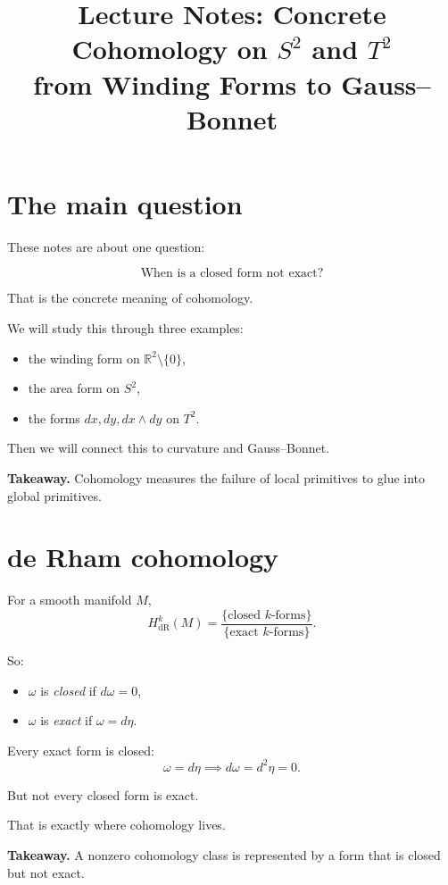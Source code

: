 \documentclass[11pt]{article}
\title{Lecture Notes: Concrete Cohomology on \(S^2\) and \(T^2\)\\
from Winding Forms to Gauss--Bonnet}
\author{}
\date{}
\newenvironment{takeaway}
{\begin{framed}\noindent\textbf{Takeaway. }}
{\end{framed}}
\begin{document}
\maketitle

\tableofcontents

\section{The main question}

These notes are about one question:

\[
\boxed{\text{When is a closed form not exact?}}
\]

That is the concrete meaning of cohomology.

We will study this through three examples:
\begin{itemize}[leftmargin=2em]
\item the winding form on \(\mathbb{R}^2\setminus\{0\}\),
\item the area form on \(S^2\),
\item the forms \(dx,dy,dx\wedge dy\) on \(T^2\).
\end{itemize}

Then we will connect this to curvature and Gauss--Bonnet.

\begin{takeaway}
Cohomology measures the failure of local primitives to glue into global primitives.
\end{takeaway}

\section{de Rham cohomology}

For a smooth manifold \(M\),
\[
H^k_{\mathrm{dR}}(M)
=
\frac{\{\text{closed }k\text{-forms}\}}{\{\text{exact }k\text{-forms}\}}.
\]

So:
\begin{itemize}[leftmargin=2em]
\item \(\omega\) is \emph{closed} if \(d\omega=0\),
\item \(\omega\) is \emph{exact} if \(\omega=d\eta\).
\end{itemize}

Every exact form is closed:
\[
\omega=d\eta \implies d\omega=d^2\eta=0.
\]

But not every closed form is exact.

That is exactly where cohomology lives.

\begin{takeaway}
A nonzero cohomology class is represented by a form that is closed but not exact.
\end{takeaway}
\end{document}
